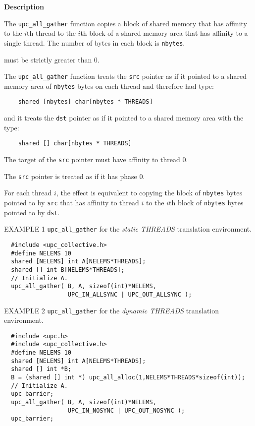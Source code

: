 {\bf Description} 

\np The {\tt upc\_all\_gather} function copies a block of shared memory
that has affinity to the $i$th thread to the $i$th block
of a shared memory area that has affinity to a single thread.
The number of bytes in each block is {\tt nbytes}.

 must be strictly greater than 0.

\np The {\tt upc\_all\_gather} function treats the {\tt src} pointer
as if it pointed to a shared memory area of {\tt nbytes} bytes on each
thread and therefore had type:

\begin{verbatim}
    shared [nbytes] char[nbytes * THREADS]
\end{verbatim}  

\np and it treats the {\tt dst} pointer as if it pointed to a shared
memory area with the type:

\begin{verbatim}
    shared [] char[nbytes * THREADS]
\end{verbatim} 

\np The target of the {\tt src} pointer must have affinity to thread 0.

\np The {\tt src} pointer is treated as if it has phase 0.

\np For each thread $i$, the effect is equivalent to copying
the block of {\tt nbytes} bytes
pointed to by {\tt src} that has affinity to thread $i$
to the $i$th block of {\tt nbytes} bytes pointed to by {\tt dst}.

\np EXAMPLE 1 {\tt upc\_all\_gather} for the {\em static THREADS}
translation environment.

\begin{verbatim}
  #include <upc_collective.h>
  #define NELEMS 10
  shared [NELEMS] int A[NELEMS*THREADS];
  shared [] int B[NELEMS*THREADS];
  // Initialize A.
  upc_all_gather( B, A, sizeof(int)*NELEMS,
                  UPC_IN_ALLSYNC | UPC_OUT_ALLSYNC );
\end{verbatim}

\np EXAMPLE 2 {\tt upc\_all\_gather} for the {\em dynamic THREADS}
translation environment.

\begin{verbatim}
  #include <upc.h>
  #include <upc_collective.h>
  #define NELEMS 10
  shared [NELEMS] int A[NELEMS*THREADS];
  shared [] int *B;
  B = (shared [] int *) upc_all_alloc(1,NELEMS*THREADS*sizeof(int));
  // Initialize A.
  upc_barrier;
  upc_all_gather( B, A, sizeof(int)*NELEMS,
                  UPC_IN_NOSYNC | UPC_OUT_NOSYNC );
  upc_barrier;
\end{verbatim}


